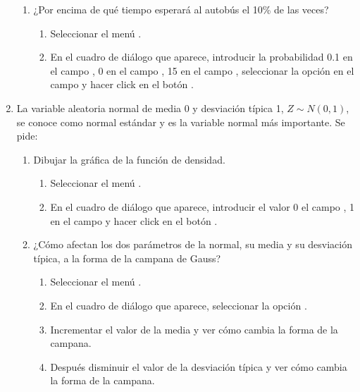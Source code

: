\begin{enumerate}[leftmargin=*]
\begin{enumerate}
\item ¿Por encima de qué tiempo esperará al autobús el 10\% de las veces?
\begin{indicacion}{
\begin{enumerate}
\item Seleccionar el menú .
\item En el cuadro de diálogo que aparece, introducir la probabilidad 0.1 en el campo ,
0 en el campo , 15 en el campo , seleccionar la opción  en el campo
 y hacer click en el botón .
\end{enumerate}}
\end{indicacion}
\end{enumerate}

\item La variable aleatoria normal de media 0 y desviación típica 1, $Z\sim N(0,1)$, se conoce como normal estándar y es
la variable normal más importante. 
Se pide:
\begin{enumerate}
\item Dibujar la gráfica de la función de densidad. 
\begin{indicacion}{
\begin{enumerate}
\item Seleccionar el menú .
\item En el cuadro de diálogo que aparece, introducir el valor 0 el campo , 1 en el campo  y hacer click en el botón .
\end{enumerate}}
\end{indicacion}

\item ¿Cómo afectan los dos parámetros de la normal, su media y su desviación típica, a la forma de la campana de Gauss?
\begin{indicacion}{
\begin{enumerate}
\item Seleccionar el menú .
\item En el cuadro de diálogo que aparece, seleccionar la opción .
\item Incrementar el valor de la media y ver cómo cambia la forma de la campana.
\item Después disminuir el valor de la desviación típica y ver cómo cambia la forma de la campana.
\end{enumerate}}
\end{indicacion}


\end{enumerate}
\end{enumerate}
